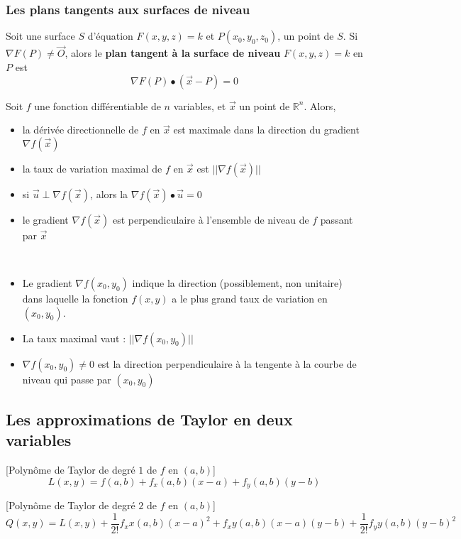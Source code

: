 		\subsubsection*{Les plans tangents aux surfaces de niveau}
			\begin{mydef}
				Soit une surface $S$ d'équation $F(x,y,z)=k$ et $P(x_0,y_0,z_0)$, un point de $S$. Si $\nabla F(P)\neq\vec{O}$, alors le \textbf{plan tangent à la surface de niveau} $F(x,y,z)=k$ en $P$ est \[\nabla F(P) \bullet (\vec{x}-P)=0\]
			\end{mydef}
			\begin{myprop}
				Soit $f$ une fonction différentiable de $n$ variables, et $\vec{x}$ un point de $\mathbb{R}^n$. Alors,
				\begin{itemize}
					\item la dérivée directionnelle de $f$ en $\vec{x}$ est maximale dans la direction du gradient $\nabla f(\vec{x})$
					\item la taux de variation maximal de $f$ en $\vec{x}$ est $||\nabla f(\vec{x})||$
					\item si $\vec{u}\perp \nabla f(\vec{x})$, alors la $ \nabla f(\vec{x})\bullet\vec{u}=0$
					\item le gradient $\nabla f(\vec{x})$ est perpendiculaire à l'ensemble de niveau de $f$ passant par $\vec{x}$
				\end{itemize}
			\end{myprop}
		\begin{myprop}
			~
		\begin{itemize}
			\item 	Le gradient $\nabla f(x_0,y_0)$ indique la direction (possiblement, non unitaire) dans laquelle la fonction $f(x,y)$ a le plus grand taux de variation en $(x_0,y_0)$.
			\item La taux maximal vaut : $||\nabla f(x_0,y_0)||$
			\item $\nabla f(x_0,y_0)\neq 0$ est la direction perpendiculaire à la tengente à la courbe de niveau qui passe par $(x_0,y_0)$ 
		\end{itemize}
		\end{myprop}
	\subsection{Les approximations de Taylor en deux variables}
		\begin{mydef}[Polynôme de Taylor de degré $1$ de $f$ en $(a,b)$]
			\[L(x,y)=f(a,b)+f_x(a,b)(x-a)+f_y(a,b)(y-b)\]
		\end{mydef}
		\begin{mydef}[Polynôme de Taylor de degré $2$ de $f$ en $(a,b)$]
			\[Q(x,y)=L(x,y) +\frac{1}{2!}f_xx(a,b)(x-a)^2+f_xy(a,b)(x-a)(y-b)+\frac{1}{2!}f_yy(a,b)(y-b)^2\]
		\end{mydef}